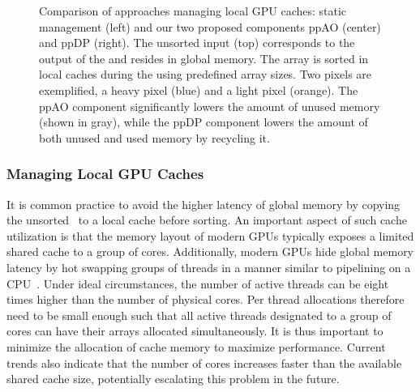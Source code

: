 \documentclass{egpubl}
\newcommand{\stencil}{ppAO}
\newcommand{\dloop}{ppDP}
\begin{document}
\begin{figure}[t]
  \centering
  \def\svgwidth{\textwidth}%
  \graphicspath{{figures/}}%
  {\sffamily\footnotesize}
  \caption{\label{fig:abuffer-local} %
    Comparison of approaches managing local GPU caches: static management (left) and our two proposed components \stencil{} (center) and \dloop{} (right).
    The unsorted input \bFraglist{} (top) corresponds to the output of the \sFill{} and resides in global memory. 
    The array is sorted in local caches during the \sResolve{} using predefined array sizes. 
    Two pixels are exemplified, a heavy pixel (blue) and a light pixel (orange). 
    The \stencil{} component significantly lowers the amount of unused memory (shown in gray), while the \dloop{} component lowers the amount of both unused and used memory by recycling it.
  }
\end{figure}


\subsubsection*{Managing Local GPU Caches}

It is common practice to avoid the higher latency of global memory by copying the unsorted \bFraglist\ to a local cache before sorting.
An important aspect of such cache utilization is that the memory layout of modern GPUs typically exposes a limited shared cache to a group of cores. 
Additionally, modern GPUs hide global memory latency by hot swapping groups of threads in a manner similar to pipelining on a CPU~\cite{Nvidia2011}. 
Under ideal circumstances, the number of active threads can be eight times higher than the number of physical cores. 
Per thread allocations therefore need to be small enough such that all active threads designated to a group of cores can have their arrays allocated simultaneously. 
It is thus important to minimize the allocation of cache memory to maximize performance. 
Current trends also indicate that the number of cores increases faster than the available shared cache size, potentially escalating this problem in the future. 
\end{document}
